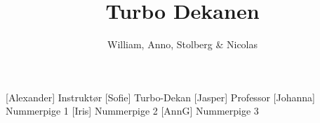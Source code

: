 \documentclass[a4paper,11pt]{article}
\title{Turbo Dekanen}
\author{William, Anno, Stolberg \& Nicolas}
\begin{document}
\maketitle

\begin{roles}
[Alexander] Instruktør
[Sofie] Turbo-Dekan
[Jasper] Professor
[Johanna] Nummerpige 1
[Iris] Nummerpige 2
[AnnG] Nummerpige 3
\end{roles}

\begin{props}
\end{props}

  
\end{document}
